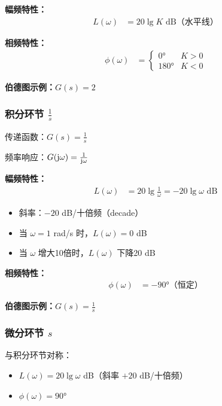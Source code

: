 \textbf{幅频特性：}
\begin{align*}
L(\omega) &= 20\lg K \text{ dB（水平线）}
\end{align*}

\textbf{相频特性：}
\begin{align*}
\phi(\omega) &= \begin{cases}
0° & K > 0 \\
180° & K < 0
\end{cases}
\end{align*}

\textbf{伯德图示例：}$G(s) = 2$
\begin{center}
\end{center}

\subsubsection{积分环节 $\frac{1}{s}$}
传递函数：$G(s) = \frac{1}{s}$

频率响应：$G(\mathrm{j}\omega) = \frac{1}{\mathrm{j}\omega}$

\textbf{幅频特性：}
\begin{align*}
L(\omega) &= 20\lg\frac{1}{\omega} = -20\lg\omega \text{ dB}
\end{align*}
\begin{itemize}
    \item 斜率：$-20$ dB/十倍频（decade）
    \item 当 $\omega = 1$ rad/s 时，$L(\omega) = 0$ dB
    \item 当 $\omega$ 增大10倍时，$L(\omega)$ 下降20 dB
\end{itemize}

\textbf{相频特性：}
\begin{align*}
\phi(\omega) &= -90°\text{（恒定）}
\end{align*}

\textbf{伯德图示例：}$G(s) = \frac{1}{s}$
\begin{center}
\end{center}

\subsubsection{微分环节 $s$}
与积分环节对称：
\begin{itemize}
    \item $L(\omega) = 20\lg\omega$ dB（斜率 $+20$ dB/十倍频）
    \item $\phi(\omega) = 90°$
\end{itemize}

